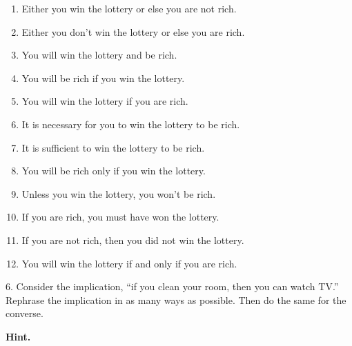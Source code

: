 \documentclass[10pt,]{book}
\theoremstyle{plain}
\theoremstyle{definition}
\numberwithin{equation}{chapter}
\begin{document}
\begin{exerciselist}
\leavevmode%
\begin{enumerate}[label=(\alph*)]
\item\hypertarget{li-35}{} Either you win the lottery or else you are not rich. %
\item\hypertarget{li-36}{} Either you don't win the lottery or else you are rich. %
\item\hypertarget{li-37}{} You will win the lottery and be rich. %
\item\hypertarget{li-38}{} You will be rich if you win the lottery. %
\item\hypertarget{li-39}{} You will win the lottery if you are rich. %
\item\hypertarget{li-40}{} It is necessary for you to win the lottery to be rich. %
\item\hypertarget{li-41}{} It is sufficient to win the lottery to be rich. %
\item\hypertarget{li-42}{} You will be rich only if you win the lottery. %
\item\hypertarget{li-43}{} Unless you win the lottery, you won't be rich. %
\item\hypertarget{li-44}{} If you are rich, you must have won the lottery. %
\item\hypertarget{li-45}{} If you are not rich, then you did not win the lottery. %
\item\hypertarget{li-46}{} You will win the lottery if and only if you are rich. %
\end{enumerate}
\par\smallskip
\item[6.]\hypertarget{exercise-6}{}
          Consider the implication, ``if you clean your room, then you can watch TV.'' Rephrase the implication in as many ways as possible. Then do the same for the converse.
\par\smallskip
\par\smallskip
\noindent\textbf{Hint.}\hypertarget{hint-1}{}\quad


\end{exerciselist}
\end{document}
